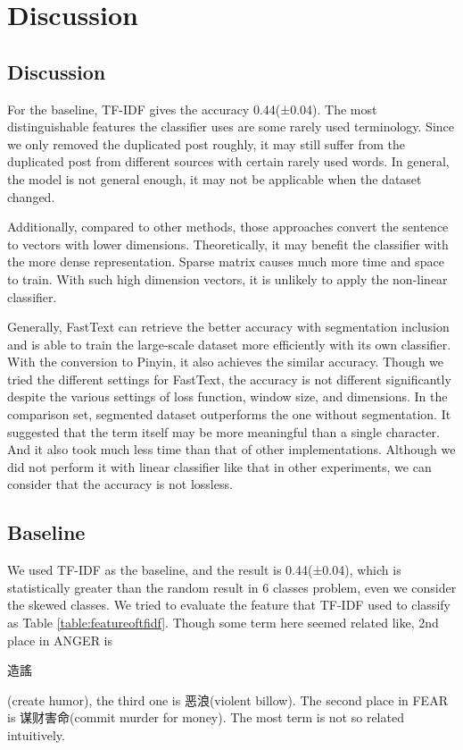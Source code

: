 \chapter{Discussion}


\section{Discussion}


For the baseline, TF-IDF gives the accuracy 0.44(±0.04). 
The most distinguishable features the classifier uses are some rarely used terminology. 
Since we only removed the duplicated post roughly, it may still suffer from the duplicated post from different sources with certain rarely used words. 
In general, the model is not general enough, it may not be applicable when the dataset changed. 

Additionally, compared to other methods, those approaches convert the sentence to vectors with lower dimensions.
Theoretically, it may benefit the classifier with the more dense representation. Sparse matrix causes much more time and space to train.
With such high dimension vectors, it is unlikely to apply the non-linear classifier.

Generally, FastText can retrieve the better accuracy with segmentation inclusion and is able to train the large-scale dataset more efficiently with its own classifier.
With the conversion to Pinyin, it also achieves the similar accuracy. Though we tried the different settings for FastText,
the accuracy is not different significantly despite the various settings of loss function, window size, and dimensions. 
In the comparison set, segmented dataset outperforms the one without segmentation. 
It suggested that the term itself may be more meaningful than a single character. And it also took much less time than that of other implementations.
Although we did not perform it with linear classifier like that in other experiments, we can consider that the accuracy is not lossless.

\section{Baseline}

\begin{CJK}{UTF8}{gbsn}
We used TF-IDF as the baseline, and the result is 0.44(±0.04), which is statistically greater than the random result in 6 classes problem, 
even we consider the skewed classes.  We tried to evaluate the feature that TF-IDF used to classify as Table \ref{table:featureoftfidf}. 
Though some term here seemed related like, 2nd place in ANGER is \begin{CJK}{UTF8}{bkai}造謠\end{CJK} (create humor), the third one is 恶浪(violent billow). 
The second place in FEAR is 谋财害命(commit murder for money). The most term is not so related intuitively. 
\end{CJK}

